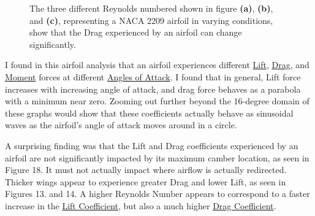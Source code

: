 \documentclass{article}
\begin{document}
\begin{figure}[!htb]
  \centering
  \caption{The three different Reynolds numbered shown in figure \textbf{(a)}, \textbf{(b)}, and \textbf{(c)}, representing a NACA 2209 airfoil in varying conditions, show that the Drag experienced by an airfoil can change significantly.}
  \label{fig:8}
\end{figure}

I found in this airfoil analysis that an airfoil experiences different \hyperlink{CL}{Lift}, \hyperlink{CL}{Drag}, and \hyperlink{CM}{Moment} forces at different \hyperlink{alpha}{Angles of Attack}. I found that in general, Lift force increases with increasing angle of attack, and drag force behaves as a parabola with a minimum near zero. Zooming out further beyond the 16-degree domain of these graphs would show that these coefficients actually behave as sinusoidal waves as the airfoil's angle of attack moves around in a circle.\newline

A surprising finding was that the Lift and Drag coefficients experienced by an airfoil are not significantly impacted by its maximum camber location, as seen in Figure 18. It must not actually impact where airflow is actually redirected. Thicker wings appear to experience greater Drag and lower Lift, as seen in Figures 13. and 14. A higher Reynolds Number appears to correspond to a faster increase in the \hyperlink{CL}{Lift Coefficient}, but also a much higher \hyperlink{CD}{Drag Coefficient}. \newline
\end{document}
